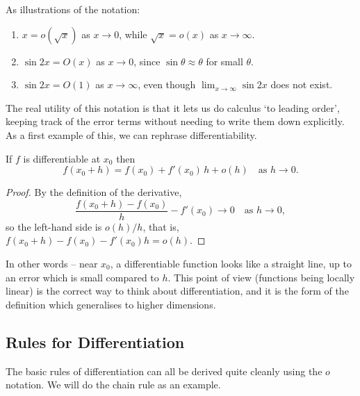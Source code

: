 \documentclass[a4paper]{scrartcl}
\begin{document}
\begin{example}
	As illustrations of the notation:
	\begin{enumerate}[label=(\roman*)]
		\item $x = o(\sqrt{x})$ as $x \to 0$, while $\sqrt{x} = o(x)$ as $x \to \infty$.
		\item $\sin 2x = O(x)$ as $x \to 0$, since $\sin \theta \approx \theta$ for small $\theta$.
		\item $\sin 2x = O(1)$ as $x \to \infty$, even though $\lim_{x \to \infty} \sin 2x$ does not exist.
	\end{enumerate}
\end{example}

The real utility of this notation is that it lets us do calculus `to leading order', keeping track of the error terms without needing to write them down explicitly. As a first example of this, we can rephrase differentiability.

\begin{proposition}
	If $f$ is differentiable at $x_0$ then
	$$
	f(x_0 + h) = f(x_0) + f'(x_0)\,h + o(h) \quad \text{as } h \to 0.
	$$
\end{proposition}
\begin{proof}
	By the definition of the derivative,
	$$
	\frac{f(x_0 + h) - f(x_0)}{h} - f'(x_0) \longrightarrow 0 \quad \text{as } h \to 0,
	$$
	so the left-hand side is $o(h)/h$, that is, $f(x_0 + h) - f(x_0) - f'(x_0) h = o(h)$.
\end{proof}

In other words -- near $x_0$, a differentiable function looks like a straight line, up to an error which is small compared to $h$. This point of view (functions being locally linear) is the correct way to think about differentiation, and it is the form of the definition which generalises to higher dimensions.

\subsection{Rules for Differentiation}

The basic rules of differentiation can all be derived quite cleanly using the $o$ notation. We will do the chain rule as an example.
\end{document}
